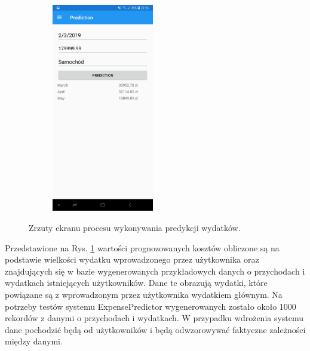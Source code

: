 \begin{figure}[!ht]
\begin{center}
\begin{subfigure}[b]{0.3\textwidth}
			\label{predykcja}
		\end{subfigure}
		\begin{subfigure}[b]{0.3\textwidth}
			\includegraphics[width=1.75in]{img/mobile/predykcja_gotowe.jpg}
			\label{predykcja_gotowe}
		\end{subfigure}
	\end{center}
	\caption{Zrzuty ekranu procesu wykonywania predykcji wydatków.}
\end{figure}

Przedstawione na Rys. \ref{predykcja} wartości prognozowanych kosztów obliczone są na podstawie wielkości wydatku wprowadzonego przez użytkownika oraz znajdujących się w bazie wygenerowanych przykładowych danych o przychodach i wydatkach istniejących użytkowników. Dane te obrazują wydatki, które powiązane są z wprowadzonym przez użytkownika wydatkiem głównym. Na potrzeby testów systemu ExpensePredictor wygenerowanych zostało około 1000 rekordów z danymi o przychodach i wydatkach. W przypadku wdrożenia systemu dane pochodzić będą od użytkowników i będą odwzorowywać faktyczne zależności między danymi.